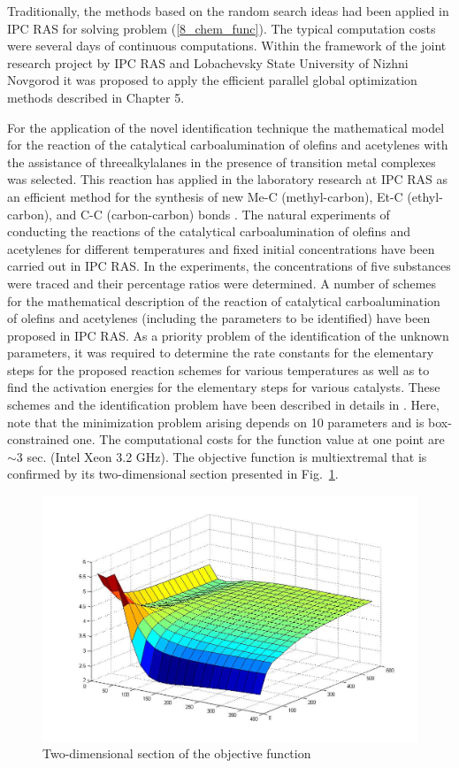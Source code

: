 Traditionally, the methods based on the random search ideas had been applied in IPC RAS for solving problem (\ref{8_chem_func}). The typical computation costs were several days of continuous computations. Within the framework of the joint research project by IPC RAS and Lobachevsky State University of Nizhni Novgorod it was proposed to apply the efficient parallel global optimization methods described in Chapter 5. %

For the application of the novel identification technique the mathematical model for the reaction of the catalytical carboalumination of olefins and acetylenes with the assistance of threealkylalanes in the presence of transition metal complexes was selected. This reaction has applied in the laboratory research at IPC RAS as an efficient method for the synthesis of new Me-C (methyl-carbon), Et-C (ethyl-carbon), and C-C (carbon-carbon) bonds \cite{8_Parfenova2009}. The natural experiments of conducting the reactions of the catalytical carboalumination of olefins and acetylenes for different temperatures and fixed initial concentrations have been carried out in IPC RAS. In the experiments, the concentrations of five substances were traced and their percentage ratios were determined. A number of schemes for the mathematical description of the reaction of catalytical carboalumination of olefins and acetylenes (including the parameters to be identified) have been proposed in IPC RAS. As a priority problem of the identification of the unknown parameters, it was required to determine the rate constants for the elementary steps for the proposed reaction schemes for various temperatures as well as to find the activation energies for the elementary steps for various catalysts. These schemes and the identification problem have been described in details in \cite{8_Gubaidullin2011}. Here, note that the minimization problem arising depends on 10 parameters and is box-constrained one. The computational costs for the function value at one point are $\sim 3$ sec. (Intel Xeon 3.2 GHz). The objective function is  multiextremal that is confirmed by its two-dimensional section presented in Fig.~\ref{8_fig_5}. 

\begin{figure}[t]
\includegraphics[width=0.8\linewidth]{figures/8_5.png}
\caption{Two-dimensional section of the objective function}
\label{8_fig_5}     
\end{figure}

